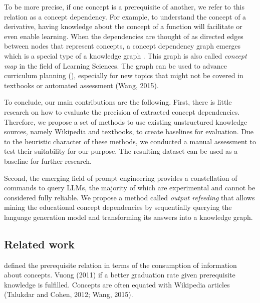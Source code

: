 \documentclass{article}
\begin{document}
To be more precise, if one concept is a prerequisite of another, we refer to this relation as a concept dependency. For example, to understand the concept of a derivative, having knowledge about the concept of a function will facilitate or even enable learning. When the dependencies are thought of as directed edges between nodes that represent concepts, a concept dependency graph emerges which is a special type of a knowledge graph \citep{wang2016using}. This graph is also called \textit{concept map} in the field of Learning Sciences.
The graph can be used to advance curriculum planning (\cite{yang2015concept}), especially for new topics that might not be covered in textbooks or automated assessment (Wang, 2015).


To conclude, our main contributions are the following.
First, there is little research on how to evaluate the precision of extracted concept dependencies. Therefore, we propose a set of methods to use existing unstructured knowledge sources, namely Wikipedia and textbooks, to create baselines for evaluation. Due to the heuristic character of these methods, we conducted a manual assessment to test their suitability for our purpose. The resulting dataset can be used as a baseline for further research.

Second, the emerging field of prompt engineering provides a constellation of commands to query LLMs, the majority of which are experimental and cannot be considered fully reliable. We propose a method called \textit{output refeeding} that allows mining the educational concept dependencies by sequentially querying the language generation model and transforming its answers into a knowledge graph.

\subsection{Related work}
\cite{talukdar2012crowdsourced} defined the prerequisite relation in terms of the consumption of information about concepts. Vuong (2011) if a better graduation rate given prerequisite knowledge is fulfilled. Concepts are often equated with Wikipedia articles (Talukdar and Cohen, 2012; Wang, 2015).
\end{document}
